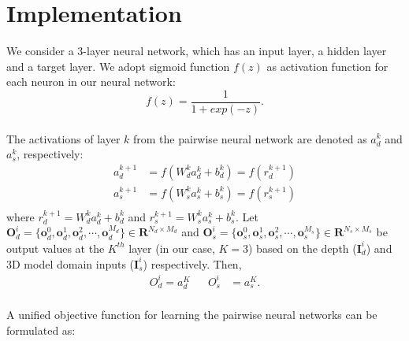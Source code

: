 \documentclass{article}
\begin{document}
\vspace{0.3cm}
\section{Implementation}
We consider a 3-layer neural network, which has an input layer, a hidden layer and a target layer.   We adopt sigmoid function $f(z)$ as activation function for each neuron in our neural network: 
\begin{equation}
f(z)=\frac{1}{1+exp(-z)}.
\end{equation}\\
The activations of layer $k$ from the pairwise neural network are denoted as  $a_d^k$ and $a_s^k$, respectively:
\begin{equation}
	\begin{aligned}
		a_{d}^{k+1} &= f(W_d^ka_d^k + b_d^k)=f(r_{d}^{k+1})\\
		a_{s}^{k+1} &= f(W_s^ka_s^k + b_s^k)=f(r_{s}^{k+1})\\
	\end{aligned}
	\label{trans1}
\end{equation}
where $r_{d}^{k+1}=W_d^ka_d^k + b_d^k$ and $r_{s}^{k+1}=W_s^ka_s^k + b_s^k$. Let $\bm{O}^{i}_{d}=\{ \bm{o}^{0}_{d}, \bm{o}^{1}_{d}, \bm{o}^{2}_{d},\cdots, \bm{o}^{M_{d}}_{d} \} \in \mathbf{R}^{N_{d} \times M_{d}}$ and $\bm{O}^{i}_{s}=\{ \bm{o}^{0}_{s}, \bm{o}^{1}_{s}, \bm{o}^{2}_{s},\cdots, \bm{o}^{M_{s}}_{s}\} \in \mathbf{R}^{N_{s} \times M_{s}}$ be output values at the $K^{th}$ layer (in our case, $K=3$) based on the depth ($\bm{I}^{i}_{d}$) and 3D model domain inputs ($\bm{I}^{i}_{s}$) respectively. Then, 
\begin{equation}
	\begin{aligned}
		O_{d}^{i} = a_{d}^{K}	&& O_{s}^{i} &= a_{s}^{K}.\\
	\end{aligned}
	\label{trans2}
\end{equation}



A unified objective function for learning the pairwise neural networks can be formulated as:
\end{document}
